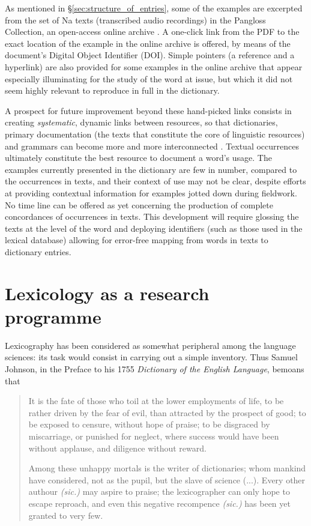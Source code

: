 As mentioned in §\ref{sec:structure_of_entries}, some of the examples are excerpted from the set of Na texts (transcribed audio recordings) in the Pangloss Collection, an open-access online archive \parencite[about which see ][]{michailovskyetal2014}. A one-click link from the PDF to the exact location of the example in the online archive is offered, by means of the document's Digital Object Identifier (DOI). Simple pointers (a reference and a hyperlink) are also provided for some examples in the online archive that appear especially illuminating for the study of the word at issue, but which it did not seem highly relevant to reproduce in full in the dictionary.

A prospect for future improvement beyond these hand-picked links consists in creating \emph{systematic}, dynamic links between resources, so that dictionaries, primary documentation (the texts that constitute the core of linguistic resources) and grammars can become more and more interconnected \parencite{maxwell2012}. Textual occurrences ultimately constitute the best resource to document a word’s usage. The examples currently presented in the dictionary are few in number, compared to the occurrences in texts, and their context of use may not be clear, despite efforts at providing contextual information for examples jotted down during fieldwork. No time line can be offered as yet concerning the production of complete concordances of occurrences in texts. This development will require glossing the texts at the level of the word and deploying identifiers (such as those used in the lexical database) allowing for error-free mapping from words in texts to dictionary entries.



\section{Lexicology as a research programme}
\label{sec:recherche}

Lexicography has been considered as somewhat peripheral among the language sciences: its task would consist in carrying out a simple inventory. Thus Samuel Johnson, in the Preface to his 1755 \emph{Dictionary of the English Language}, bemoans that

\begin{quotation}
    It is the fate of those who toil at the lower employments of life, to be rather driven by the fear of evil, than attracted by the prospect of good; to be exposed to censure, without hope of praise; to be disgraced by miscarriage, or punished for neglect, where success would have been without applause, and diligence without reward.

    Among these unhappy mortals is the writer of dictionaries; whom mankind have considered, not as the pupil, but the slave of science (...). Every other authour \emph{(sic.)} may aspire to praise; the lexicographer can only hope to escape reproach, and even this negative recompence \emph{(sic.)} has been yet granted to very few.
\end{quotation}

